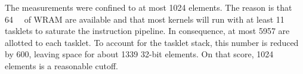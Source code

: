 The measurements were confined to at most \num{1024} elements.
The reason is that \qty{64}{\kibi\byte} of \ac{WRAM} are available and that most kernels will run with at least 11 tasklets to saturate the instruction pipeline.
In consequence, at most \qty{5957}{\byte} are allotted to each tasklet.
To account for the tasklet stack, this number is reduced by \qty{600}{\byte}, leaving space for about \num{1339} 32-bit elements.
On that score, 1024 elements is a reasonable cutoff.












